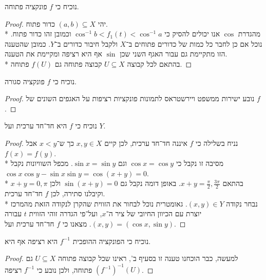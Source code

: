 \Subquestion{}
נוכיח כי $f$ פונקציה פתוחה.
\begin{proof}
	יהי $(a, b) \subseteq X$ כדור פתוח. \\*
	מהגדרת $\cos$ אנו יכולים להסיק כי $\cos^{-1} b < f_1(t) < \cos^{-1} a$ וכמובן זהו כדור פתוח. נוכל אם כן לחבר כל כמות של כדורים פתוחים ב־$X$ ולקבל חיבור כדורים ב־$Y$. 
	כמובן שהטענה הזו מתקיימת גם עבור האגף השני שכן $\sin$ אף היא רציפה ומקיימת את הטענה. \\*
	בהתאם לכל קבוצה $U \subseteq X$ קבוצה פתוחה גם $f(U)$ פתוחה.
\end{proof}

\Subquestion{}
נוכיח כי $f$ פונקציה סגורה.
\begin{proof}
	נובע ישירות ממשפט ויירשטראס לתמונות פונקציות רציפות על האגפים השונים של $f$.
\end{proof}

\Subquestion{}
נוכיח כי $f$ היא חד־חד ערכית ועל $Y$.
\begin{proof}
	נניח בשלילה כי $f$ איננה חד־חד ערכית, לכן קיים $x, y \in X$ כך ש־$x < y$ אבל $f(x) = f(y)$. \\*
	מסיבה זו נקבל כי $\cos x = \cos y$ וגם $\sin x = \sin y$. מכפל השוויונות נקבל $\cos x \cos y - \sin x \sin y = \cos(x + y) = 0$. \\*
	בהתאם $x + y = \frac{\pi}{2}, \frac{3 \pi}{2}$. באופן דומה נקבל גם $\sin(x + y) = 0$ ולכן $x + y = 0, \pi$ וקיבלנו סתירה, לכן $f$ חד־חד ערכית. \\*
	נבחר נקודה $(x, y) \in Y$. גאומטרית נוכל לבחור את הזווית שהקרן לנקודה הזאת מהמרכז יוצרת עם הכיוון החיובי של ציר ה־$x$, ועל־פי הגדרה זוהי הזווית $t$ עבורה $(x, y) = (\cos x, \sin y)$.
	מצאנו כי $f$ חד־חד ערכית ועל.
\end{proof}

\Subquestion{}
נוכיח כי הפונקציה ההופכית $f^{-1}$ היא רציפה אף היא.
\begin{proof}
	למעשה, כבר הוכחנו טענה זו בסעיף ב', ראינו שכל קבוצה פתוחה $U \subseteq X$ גם ${(f^{-1})}^{-1}(U)$ פתוחה, ולכן נובע כי $f^{-1}$ רציפה.
\end{proof}

